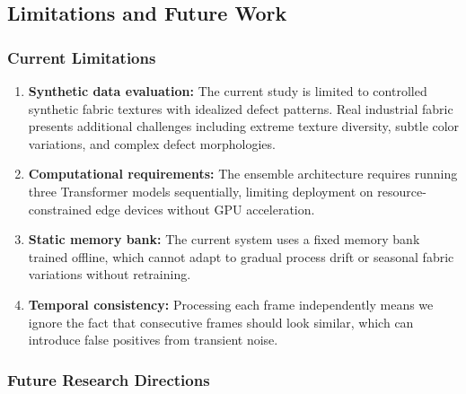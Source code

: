 \documentclass[journal]{IEEEtran}
\begin{document}
\subsection{Limitations and Future Work}

\subsubsection{Current Limitations}

\begin{enumerate}[nosep]
    \item \textbf{Synthetic data evaluation:} The current study is limited to controlled synthetic fabric textures with idealized defect patterns. Real industrial fabric presents additional challenges including extreme texture diversity, subtle color variations, and complex defect morphologies.
    \item \textbf{Computational requirements:} The ensemble architecture requires running three Transformer models sequentially, limiting deployment on resource-constrained edge devices without GPU acceleration.
    \item \textbf{Static memory bank:} The current system uses a fixed memory bank trained offline, which cannot adapt to gradual process drift or seasonal fabric variations without retraining.
    \item \textbf{Temporal consistency:} Processing each frame independently means we ignore the fact that consecutive frames should look similar, which can introduce false positives from transient noise.
\end{enumerate}

\subsubsection{Future Research Directions}
\end{document}
